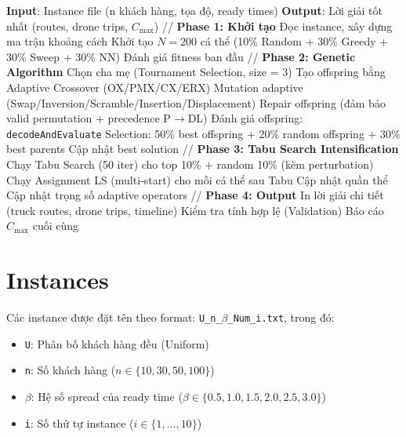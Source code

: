\documentclass[12pt,a4paper]{article}
\begin{document}
\begin{algorithm}[h!]
\caption{Quy trình tổng thể: GA + Tabu Search}
\begin{algorithmic}[1]
\STATE \textbf{Input}: Instance file (n khách hàng, tọa độ, ready times)
\STATE \textbf{Output}: Lời giải tốt nhất (routes, drone trips, $C_{\max}$)
\STATE
\STATE // \textbf{Phase 1: Khởi tạo}
\STATE Đọc instance, xây dựng ma trận khoảng cách
\STATE Khởi tạo $N = 200$ cá thể (10\% Random + 30\% Greedy + 30\% Sweep + 30\% NN)
\STATE Đánh giá fitness ban đầu
\STATE
\STATE // \textbf{Phase 2: Genetic Algorithm}
    \STATE Chọn cha mẹ (Tournament Selection, size = 3)
    \STATE Tạo offspring bằng Adaptive Crossover (OX/PMX/CX/ERX)
    \STATE Mutation adaptive (Swap/Inversion/Scramble/Insertion/Displacement)
    \STATE Repair offspring (đảm bảo valid permutation + precedence P$\to$DL)
    \STATE Đánh giá offspring: \texttt{decodeAndEvaluate}
    \STATE Selection: 50\% best offspring + 20\% random offspring + 30\% best parents
    \STATE Cập nhật best solution
    \STATE
        \STATE // \textbf{Phase 3: Tabu Search Intensification}
        \STATE Chạy Tabu Search (50 iter) cho top 10\% + random 10\% (kèm perturbation)
        \STATE Chạy Assignment LS (multi-start) cho mỗi cá thể sau Tabu
        \STATE Cập nhật quần thể
    \ENDIF
    \STATE Cập nhật trọng số adaptive operators
\ENDFOR
\STATE
\STATE // \textbf{Phase 4: Output}
\STATE In lời giải chi tiết (truck routes, drone trips, timeline)
\STATE Kiểm tra tính hợp lệ (Validation)
\STATE Báo cáo $C_{\max}$ cuối cùng
\end{algorithmic}
\end{algorithm}

\section{Instances}

Các instance được đặt tên theo format: \texttt{U\_n\_$\beta$\_Num\_i.txt}, trong đó:
\begin{itemize}[nosep]
    \item \texttt{U}: Phân bố khách hàng đều (Uniform)
    \item \texttt{n}: Số khách hàng ($n \in \{10, 30, 50, 100\}$)
    \item $\beta$: Hệ số spread của ready time ($\beta \in \{0.5, 1.0, 1.5, 2.0, 2.5, 3.0\}$)
    \item \texttt{i}: Số thứ tự instance ($i \in \{1, \ldots, 10\}$)
\end{itemize}
\end{document}
